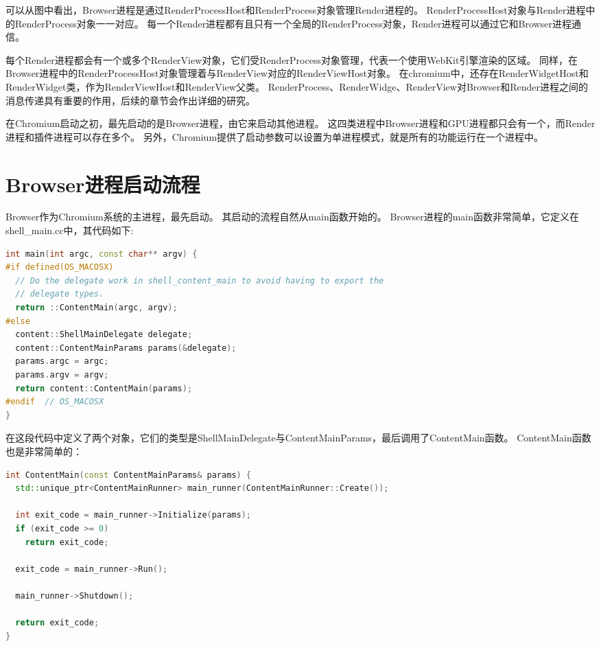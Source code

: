 可以从图中看出，Browser进程是通过RenderProcessHost和RenderProcess对象管理Render进程的。
RenderProcessHost对象与Render进程中的RenderProcess对象一一对应。
每一个Render进程都有且只有一个全局的RenderProcess对象，Render进程可以通过它和Browser进程通信。

每个Render进程都会有一个或多个RenderView对象，它们受RenderProcess对象管理，代表一个使用WebKit引擎渲染的区域。
同样，在Browser进程中的RenderProcessHost对象管理着与RenderView对应的RenderViewHost对象。
在chromium中，还存在RenderWidgetHost和RenderWidget类，作为RenderViewHost和RenderView父类。
RenderProcess、RenderWidge、RenderView对Browser和Render进程之间的消息传递具有重要的作用，后续的章节会作出详细的研究。

在Chromium启动之初，最先启动的是Browser进程，由它来启动其他进程。
这四类进程中Browser进程和GPU进程都只会有一个，而Render进程和插件进程可以存在多个。
另外，Chromium提供了启动参数可以设置为单进程模式，就是所有的功能运行在一个进程中。

\section{Browser进程启动流程}
Browser作为Chromium系统的主进程，最先启动。
其启动的流程自然从main函数开始的。
Browser进程的main函数非常简单，它定义在shell\_main.cc中，其代码如下:

\begin{spacing}{1.0}
\begin{lstlisting}[language={C++}]
int main(int argc, const char** argv) {
#if defined(OS_MACOSX)
  // Do the delegate work in shell_content_main to avoid having to export the
  // delegate types.
  return ::ContentMain(argc, argv);
#else
  content::ShellMainDelegate delegate;
  content::ContentMainParams params(&delegate);
  params.argc = argc;
  params.argv = argv;
  return content::ContentMain(params);
#endif  // OS_MACOSX
}
\end{lstlisting}
\end{spacing}

在这段代码中定义了两个对象，它们的类型是ShellMainDelegate与ContentMainParams，最后调用了ContentMain函数。
ContentMain函数也是非常简单的：

\begin{spacing}{1.0}
\begin{lstlisting}[language={C++}]
int ContentMain(const ContentMainParams& params) {
  std::unique_ptr<ContentMainRunner> main_runner(ContentMainRunner::Create());

  int exit_code = main_runner->Initialize(params);
  if (exit_code >= 0)
    return exit_code;

  exit_code = main_runner->Run();

  main_runner->Shutdown();

  return exit_code;
}
\end{lstlisting}
\end{spacing}

